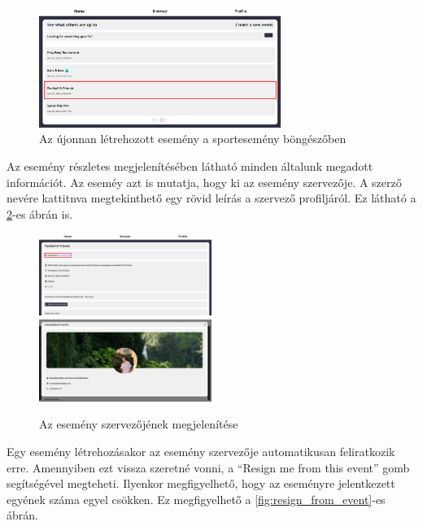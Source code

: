 \newpage

\begin{figure}[ht]
	\centering
	\includegraphics[width=0.7\textwidth]{images/new_event_created.png}
	\caption{Az újonnan létrehozott esemény a sportesemény böngészőben}
	\label{fig:new_event_created}
\end{figure}

Az esemény részletes megjelenítésében látható minden általunk megadott információt. Az eseméy azt is mutatja, hogy ki az esemény szervezője. A szerző nevére
kattitnva megtekinthető egy rövid leírás a szervező profiljáról. Ez látható a \ref{fig:event_creator}-es ábrán is.

\begin{figure}[h]
	\includegraphics[width=0.5\textwidth]{images/sports_event_creator.png}
	\includegraphics[width=0.5\textwidth]{images/sports_event_creator_profile_view.png}
	\caption{Az esemény szervezőjének megjelenítése}
	\label{fig:event_creator}
\end{figure}

Egy esemény létrehozásakor az esemény szervezője automatikusan feliratkozik erre. Amennyiben ezt vissza szeretné vonni, a
``Resign me from this event'' gomb segítségével megteheti. Ilyenkor megfigyelhető, hogy az eseményre jelentkezett egyének száma egyel csökken.
Ez megfigyelhető a \ref{fig:resign_from_event}-es ábrán.

